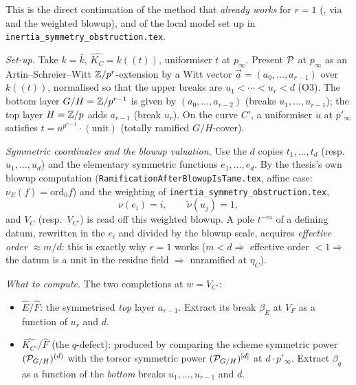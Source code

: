 \documentclass[11pt]{article}
\begin{document}
This is the direct continuation of the method that \emph{already works} for
$r=1$ (, via
 and the weighted blowup), and of the
local model set up in \texttt{inertia\_symmetry\_obstruction.tex}.

\smallskip
\noindent\emph{Set-up.} Take $k=\bar k$, $\widehat{K_C}=k((t))$, uniformiser $t$
at $p_\infty$. Present $\mathcal{P}$ at $p_\infty$ as an Artin--Schreier--Witt
$\mathbb{Z}/p^r$-extension by a Witt vector $\vec a=(a_0,\dots,a_{r-1})$ over $k((t))$,
normalised so that the upper breaks are $u_1<\cdots<u_r<d$ (O3). The bottom
layer $G/H=\mathbb{Z}/p^{r-1}$ is given by $(a_0,\dots,a_{r-2})$ (breaks
$u_1,\dots,u_{r-1}$); the top layer $H=\mathbb{Z}/p$ adds $a_{r-1}$ (break $u_r$).
On the curve $C'$, a uniformiser $u$ at $p'_\infty$ satisfies
$t = u^{p^{r-1}}\cdot(\text{unit})$ (totally ramified $G/H$-cover).

\smallskip
\noindent\emph{Symmetric coordinates and the blowup valuation.} Use the $d$
copies $t_1,\dots,t_d$ (resp.\ $u_1,\dots,u_d$) and the elementary symmetric
functions $e_1,\dots,e_d$. By the thesis's own blowup computation
(\texttt{RamificationAfterBlowupIsTame.tex}, affine case:
$\nu_E(f)=\mathrm{ord}_0 f$) and the weighting of
\texttt{inertia\_symmetry\_obstruction.tex},
\[
\nu(e_i)=i ,\qquad \widetilde\nu(u_j)=1 ,
\]
and $V_C$ (resp.\ $V_{C'}$) is read off this weighted blowup. A pole $t^{-m}$
of a defining datum, rewritten in the $e_i$ and divided by the blowup scale,
acquires \emph{effective order} $\approx m/d$: this is exactly why $r=1$ works
($m<d\Rightarrow$ effective order $<1\Rightarrow$ the datum is a unit in the
residue field $\Rightarrow$ unramified at $\eta_C$).

\smallskip
\noindent\emph{What to compute.} The two completions at $w=V_{C'}$:
\begin{itemize}
  \item $\widehat E/\widehat F$: the symmetrised \emph{top} layer $a_{r-1}$.
        Extract its break $\beta_E$ at $V_F$ as a function of $u_r$ and $d$.
  \item $\widehat{K_{C'}}/\widehat F$ (the $q$-defect): produced by comparing
        the scheme symmetric power $(\mathcal{P}_{G/H})^{(d)}$ with the torsor symmetric
        power $(\mathcal{P}_{G/H})^{[d]}$ at $d\cdot p'_\infty$. Extract $\beta_q$ as a
        function of the \emph{bottom} breaks $u_1,\dots,u_{r-1}$ and $d$.
\end{itemize}
\end{document}

